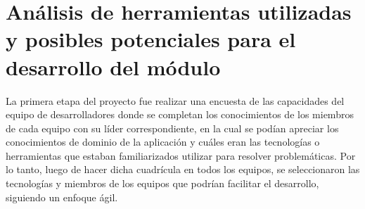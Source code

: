 \section{Análisis de herramientas utilizadas y posibles potenciales para el desarrollo del módulo}
La primera etapa del proyecto fue realizar una encuesta de las capacidades del equipo de desarrolladores donde se completan los conocimientos de los miembros de cada equipo con su líder correspondiente, en la cual se podían apreciar los conocimientos de dominio de la aplicación y cuáles eran las tecnologías o herramientas que estaban familiarizados utilizar para resolver problemáticas. Por lo tanto, luego de hacer dicha cuadrícula en todos los equipos, se seleccionaron las tecnologías y miembros de los equipos que podrían facilitar el desarrollo, siguiendo un enfoque ágil.